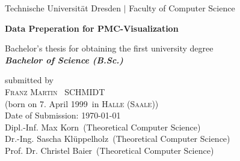 \documentclass[a4paper,12pt,leqno]{article}
\newcommand{\name}{Schmidt}
\newcommand{\vorname}{Franz Martin}
\newcommand{\gebdatum}{7. April 1999}
\newcommand{\ort}{Halle (Saale)}
\newcommand{\betreuer}{Dipl.-Inf. Max Korn}
\newcommand{\gutachtereins}{Dr.-Ing. Sascha Klüppelholz}
\newcommand{\gutachterzwei}{Prof. Dr. Christel Baier}
\newcommand{\institut}{Theoretical Computer Science}
\newcommand{\thema}{Data Preperation for PMC-Visualization}
\newcommand{\datum}{\today} %
\begin{document}

\begin{titlepage}

\thispagestyle{empty}

\begin{center}

	
{\Large Technische Universit\"{a}t Dresden $\mid$ Faculty of Computer Science}

\vfil\vfil

{\bfseries\Huge\thema}

\vfil\vfil
{\LARGE
Bachelor's thesis for obtaining the first university degree \\[\bigskipamount]
\bfseries{\itshape Bachelor of Science (B.Sc.)}\\[\bigskipamount]
}

\vfil\vfil

\vfil

\vspace{1cm}

submitted by
\\[\bigskipamount]
\textsc{\vorname\ } \MakeUppercase{\name}
\\[\bigskipamount]
(born on \gebdatum\ in \textsc{\ort})
\\[\bigskipamount]
Date of Submission: \datum
\\[\bigskipamount]
\betreuer\ (\institut)
\\[\smallskipamount]
\gutachtereins\ (\institut)
\\[\smallskipamount]
\gutachterzwei\ (\institut)
\vspace{-3cm}
\end{center}
\end{titlepage}
%
%
%
\end{document}
